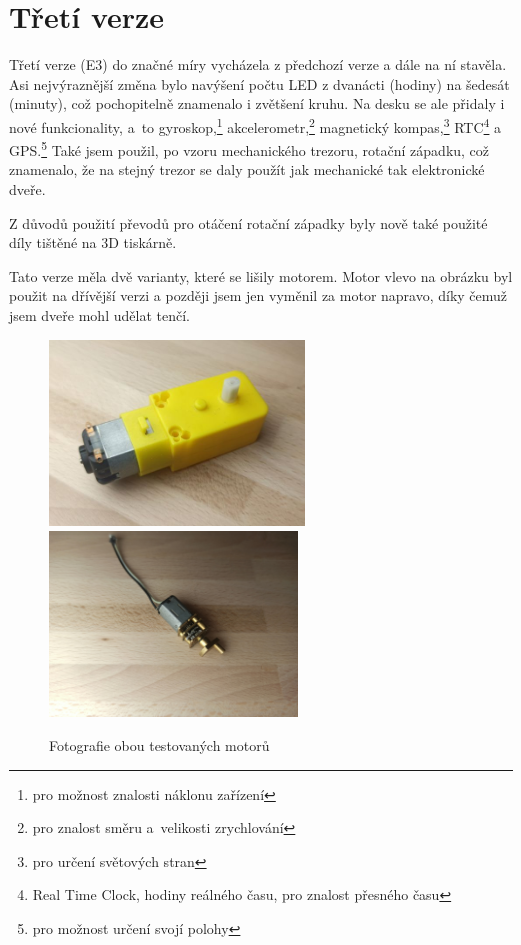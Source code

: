 \section{Třetí verze}
\label{E3-vyvoj}

Třetí verze (E3) do značné míry vycházela z předchozí verze a dále na ní stavěla. Asi nejvýraznější změna bylo navýšení počtu 
LED z dvanácti (hodiny) na šedesát (minuty), což pochopitelně znamenalo i zvětšení kruhu. Na desku se ale přidaly i nové funkcionality,
a~to gyroskop,\footnote{pro možnost znalosti náklonu zařízení} akcelerometr,\footnote{pro znalost směru a~velikosti zrychlování} magnetický kompas,\footnote{pro určení světových
stran} RTC\footnote{Real Time Clock, hodiny reálného času, pro znalost přesného času} a GPS.\footnote{pro možnost určení svojí polohy}
Také jsem použil, po vzoru mechanického trezoru, rotační západku, což znamenalo, že na stejný trezor se daly použít jak mechanické tak 
elektronické dveře.

Z důvodů použití převodů pro otáčení rotační západky byly nově také použité díly tištěné na 3D tiskárně. 

Tato verze měla dvě varianty, které se lišily motorem.
Motor vlevo na obrázku  byl použit na dřívější verzi a později jsem jen vyměnil za motor napravo, 
díky čemuž jsem dveře mohl udělat tenčí. %
\begin{figure}[htbp]
    \centering
    \includegraphics[height=140pt]{kapitoly/obrazky/E3/motory/zluty_motor.jpg}
    \includegraphics[height=140pt]{kapitoly/obrazky/E3/motory/hodinovyStrojek.jpg}
    \caption{Fotografie obou testovaných motorů} 
    \label{fig:E3-motory}
\end{figure}